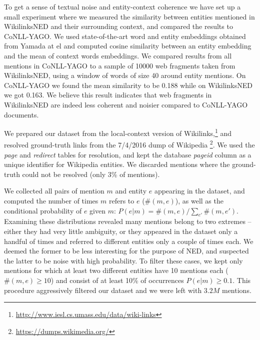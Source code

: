 \documentclass[11pt]{article}
\begin{document}
To get a sense of textual noise and entity-context coherence we have set up a small experiment where we measured the similarity between entities mentioned in WikilinksNED and their surrounding context, and compared the results to CoNLL-YAGO. We used state-of-the-art word and entity embeddings obtained from Yamada at el \cite{yamada2016joint} and computed cosine similarity between an entity embedding and the mean of context words embeddings. We compared results from all mentions in CoNLL-YAGO to a sample of 10000 web fragments taken from WikilinksNED, using a window of words of size 40 around entity mentions. On CoNLL-YAGO we found the mean similarity to be 0.188 while on WikilinksNED we got 0.163. We believe this result indicates that web fragments in WikilinksNED are indeed less coherent and noisier compared to CoNLL-YAGO documents.


We prepared our dataset from the local-context version of Wikilinks,\footnote{\url{http://www.iesl.cs.umass.edu/data/wiki-links}} and resolved ground-truth links from the 7/4/2016 dump of Wikipedia \footnote{\url{https://dumps.wikimedia.org/}}. We used the \emph{page} and \emph{redirect} tables for resolution, and kept the database \emph{pageid} column as a unique identifier for Wikipedia entities. We discarded mentions where the ground-truth could not be resolved (only 3\% of mentions).

We collected all pairs of mention $m$ and entity $e$ appearing in the dataset, and computed the number of times $m$ refers to $e$ ($\#(m,e)$), as well as the conditional probability of $e$ given $m$: $P(e|m)=\#(m,e)/\sum_{e'}\#(m,e')$. Examining these distributions revealed many mentions belong to two extremes -- either they had very little ambiguity, or they appeared in the dataset only a handful of times and referred to different entities only a couple of times each. We deemed the former to be less interesting for the purpose of NED, and suspected the latter to be noise with high probability. To filter these cases, we kept only mentions for which at least two different entities have 10 mentions each ($\#(m,e) \ge 10$) and consist of at least 10\% of occurrences $P(e|m) \ge 0.1$. This procedure aggressively filtered our dataset and we were left with $3.2M$ mentions.
\end{document}
